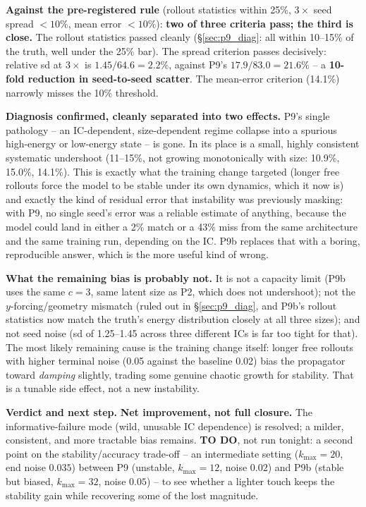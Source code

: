\documentclass[11pt]{article}
\begin{document}
\textbf{Against the pre-registered rule} (rollout statistics within 25\%,
$3\times$ seed spread $<10\%$, mean error $<10\%$): \textbf{two of three
criteria pass; the third is close.} The rollout statistics passed
cleanly (\S\ref{sec:p9_diag}: all within 10--15\% of the truth, well
under the 25\% bar). The spread criterion passes decisively: relative
sd at $3\times$ is $1.45/64.6=2.2\%$, against P9's $17.9/83.0=21.6\%$ --
a \textbf{10-fold reduction in seed-to-seed scatter}. The mean-error
criterion (14.1\%) narrowly misses the 10\% threshold.

\textbf{Diagnosis confirmed, cleanly separated into two effects.} P9's
single pathology -- an IC-dependent, size-dependent regime collapse
into a spurious high-energy or low-energy state -- is gone. In its
place is a small, highly consistent systematic undershoot (11--15\%,
not growing monotonically with size: 10.9\%, 15.0\%, 14.1\%). This is
exactly what the training change targeted (longer free rollouts force
the model to be stable under its own dynamics, which it now is) and
exactly the kind of residual error that instability was previously
masking: with P9, no single seed's error was a reliable estimate of
anything, because the model could land in either a 2\% match or a
43\% miss from the same architecture and the same training run,
depending on the IC. P9b replaces that with a boring, reproducible
answer, which is the more useful kind of wrong.

\textbf{What the remaining bias is probably not.} It is not a capacity
limit (P9b uses the same $c{=}3$, same latent size as P2, which does
not undershoot); not the $y$-forcing/geometry mismatch (ruled out in
\S\ref{sec:p9_diag}, and P9b's rollout statistics now match the truth's
energy distribution closely at all three sizes); and not seed noise (sd
of 1.25--1.45 across three different ICs is far too tight for that).
The most likely remaining cause is the training change itself: longer
free rollouts with higher terminal noise (0.05 against the baseline
0.02) bias the propagator toward \emph{damping} slightly, trading some
genuine chaotic growth for stability. That is a tunable side effect,
not a new instability.

\textbf{Verdict and next step.} \textbf{Net improvement, not full
closure.} The informative-failure mode (wild, unusable IC dependence)
is resolved; a milder, consistent, and more tractable bias remains.
\textbf{TO DO}, not run tonight: a second point on the
stability/accuracy trade-off -- an intermediate setting ($k_{\max}=20$,
end noise $0.035$) between P9 (unstable, $k_{\max}{=}12$, noise $0.02$)
and P9b (stable but biased, $k_{\max}{=}32$, noise $0.05$) -- to see
whether a lighter touch keeps the stability gain while recovering some
of the lost magnitude.
\end{document}
